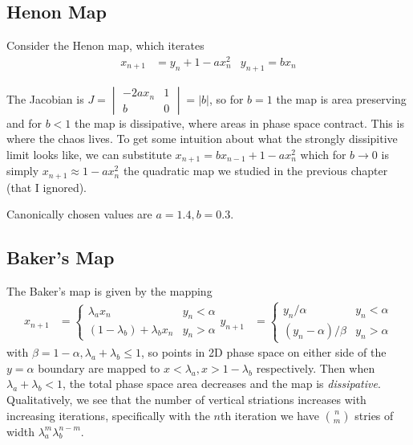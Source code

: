 \documentclass[10pt]{article}
\begin{document}
\subsection{Henon Map}

Consider the Henon map, which iterates
\begin{align}
    x_{n+1} &= y_n + 1 - ax_n^2 & y_{n+1} = bx_n
\end{align}

The Jacobian is $J =
\begin{vmatrix}
    -2ax_n & 1\\
    b & 0
\end{vmatrix} = |b|$, so for $b=1$ the map is area preserving and for $b < 1$
the map is dissipative, where areas in phase space contract. This is where the
chaos lives. To get some intuition about what the strongly dissipitive limit
looks like, we can substitute $x_{n+1} = bx_{n-1} + 1 - ax_n^2$ which for $b \to
0$ is simply $x_{n+1} \approx 1 - ax_n^2$ the quadratic map we studied in the
previous chapter (that I ignored).

Canonically chosen values are $a = 1.4, b = 0.3$.

\subsection{Baker's Map}

The Baker's map is given by the mapping
\begin{align}
    x_{n+1} &=
    \begin{cases}
        \lambda_a x_n & y_n < \alpha\\
        (1 - \lambda_b) + \lambda_b x_n & y_n > \alpha
    \end{cases}
    y_{n+1} &=
    \begin{cases}
        y_n/\alpha & y_n < \alpha\\
        (y_n - \alpha) / \beta & y_n > \alpha
    \end{cases}
\end{align}
with $\beta = 1-\alpha, \lambda_a + \lambda_b \leq 1$, so points in 2D phase
space on either side of the $y=\alpha$ boundary are mapped to $x < \lambda_a, x
> 1-\lambda_b$ respectively. Then when $\lambda_a + \lambda_b < 1$, the total
phase space area decreases and the map is \emph{dissipative}. Qualitatively, we
see that the number of vertical striations increases with increasing iterations,
specifically with the $n$th iteration we have $\binom{n}{m}$ stries of width
$\lambda_a^m\lambda_b^{n-m}$.
\end{document}
